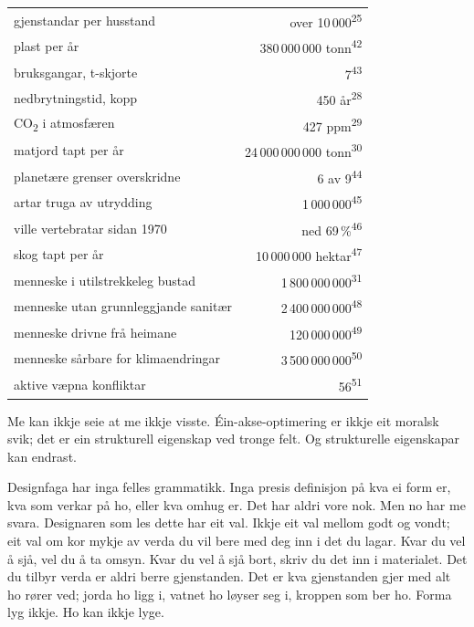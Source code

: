 \begin{widebody}
{\bigskip
\begin{center}
\footnotesize
\renewcommand{\arraystretch}{1.15}
\begin{tabular}{@{}p{46mm}r@{}}
\toprule
gjenstandar per husstand & over 10\,000\textsuperscript{25} \\
plast per år & 380\,000\,000 tonn\textsuperscript{42} \\
bruksgangar, t-skjorte & 7\textsuperscript{43} \\
nedbrytningstid, kopp & 450 år\textsuperscript{28} \\
CO\textsubscript{2} i atmosfæren & 427 ppm\textsuperscript{29} \\
matjord tapt per år & 24\,000\,000\,000 tonn\textsuperscript{30} \\
planetære grenser overskridne & 6 av 9\textsuperscript{44} \\
artar truga av utrydding & 1\,000\,000\textsuperscript{45} \\
ville vertebratar sidan 1970 & ned 69\,\%\textsuperscript{46} \\
skog tapt per år & 10\,000\,000 hektar\textsuperscript{47} \\
menneske i utilstrekkeleg bustad & 1\,800\,000\,000\textsuperscript{31} \\
menneske utan grunnleggjande sanitær & 2\,400\,000\,000\textsuperscript{48} \\
menneske drivne frå heimane & 120\,000\,000\textsuperscript{49} \\
menneske sårbare for klimaendringar & 3\,500\,000\,000\textsuperscript{50} \\
aktive væpna konfliktar & 56\textsuperscript{51} \\
\bottomrule
\end{tabular}
\end{center}
\bigskip

Me kan ikkje seie at me ikkje visste. Éin-akse-optimering er ikkje eit moralsk svik; det er ein strukturell eigenskap ved tronge felt. Og strukturelle eigenskapar kan endrast.

Designfaga har inga felles grammatikk. Inga presis definisjon på kva ei form er, kva som verkar på ho, eller kva omhug er. Det har aldri vore nok. Men no har me svara. Designaren som les dette har eit val. Ikkje eit val mellom godt og vondt; eit val om kor mykje av verda du vil bere med deg inn i det du lagar. Kvar du vel å sjå, vel du å ta omsyn. Kvar du vel å sjå bort, skriv du det inn i materialet. Det du tilbyr verda er aldri berre gjenstanden. Det er kva gjenstanden gjer med alt ho rører ved; jorda ho ligg i, vatnet ho løyser seg i, kroppen som ber ho. Forma lyg ikkje. Ho kan ikkje lyge.

}
\end{widebody}
